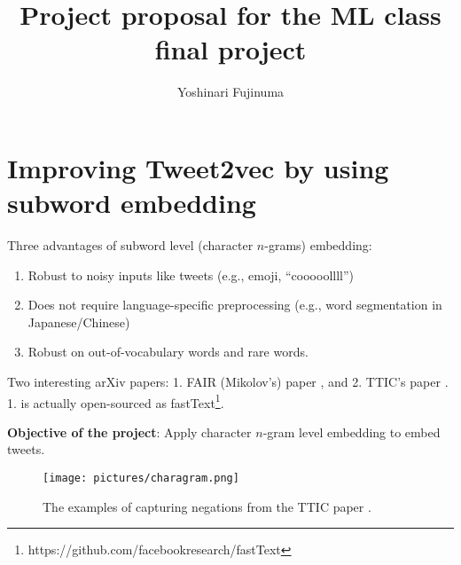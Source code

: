 \documentclass[11pt]{article}
\begin{document}
\vspace{-1cm}
\title{\vspace{-2ex}Project proposal for the ML class final project\vspace{-2ex}}
\author{Yoshinari Fujinuma\vspace{-2ex}}
\date{\vspace{-2ex}}
\maketitle

\vspace{-0.5cm}

\section{Improving Tweet2vec by using subword embedding}

Three advantages of subword level (character $n$-grams) embedding:

\begin{enumerate}
 \setlength\itemsep{0.01em}
 \item Robust to noisy inputs like tweets (e.g., emoji, ``cooooollll'')
 \item Does not require language-specific preprocessing (e.g., word segmentation in Japanese/Chinese)
 \item Robust on out-of-vocabulary words and rare words.
\end{enumerate}

Two interesting arXiv papers: 1. FAIR (Mikolov's) paper \cite{bojanowski2016enriching}, and 2. TTIC's paper \cite{WietingBGL16}. 1. is actually open-sourced as fastText\footnote{https://github.com/facebookresearch/fastText}.

{\bf Objective of the project}: Apply character $n$-gram level embedding to embed tweets.

\begin{figure}[htb]
  \begin{center}
     \scalebox{0.6}
      {\texttt{[image: pictures/charagram.png]}}

      \caption{The examples of capturing negations from the TTIC paper \cite{WietingBGL16}. }
      \label{fig:learning_rate}
     \end{center}
\vspace{-0.5cm}
\end{figure}





\end{document}
